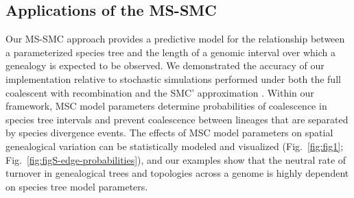 \documentclass[11pt]{article}
\begin{document}
\subsection{Applications of the MS-SMC}
Our MS-SMC approach provides a predictive model for the relationship between 
a parameterized species tree and the length of a genomic interval over which 
a genealogy is expected to be observed. We demonstrated the accuracy of our 
implementation relative to stochastic simulations performed under both the 
full coalescent with recombination and the SMC' approximation 
\citep{hudson1983properties,wiuf_recombination_1999,mcvean2005approximating}. 
Within our framework, MSC model parameters determine probabilities of coalescence
in species tree intervals and prevent coalescence between lineages that are separated
by species divergence events.
The effects of MSC model parameters on spatial genealogical variation can be statistically
modeled and visualized (Fig.~\ref{fig:fig1}; Fig.~\ref{fig:figS-edge-probabilities}), and 
our examples show that the neutral rate
of turnover in genealogical trees and topologies across a genome is highly 
dependent on species tree model parameters.


\end{document}
